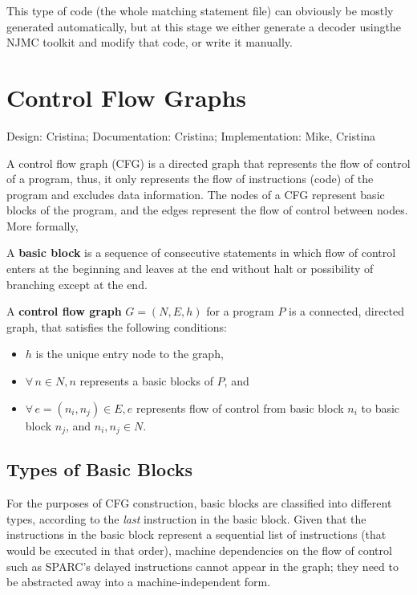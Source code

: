 This type of code (the whole matching statement file) can
obviously be mostly generated automatically, but at this stage we
either generate a decoder usingthe NJMC toolkit and modify that
code, or write it manually.


\section{Control Flow Graphs}
\label{sec-cfg}

{\small
\begin{flushright}
Design: Cristina; Documentation: Cristina; Implementation: Mike, Cristina
\end{flushright} 
}

A control flow graph (CFG) is a directed graph that represents the flow of 
control of a program, thus, it only represents the flow of instructions 
(code) of the program and excludes data information.
The nodes of a CFG represent basic blocks of the program, and the edges 
represent the flow of control between nodes.  More formally,

\begin{definition} \cite{Aho86}
\label{def-bb}
A {\bf basic block} is a sequence of consecutive statements in which
flow of control enters at the beginning and leaves at the end without
halt or possibility of branching except at the end.   
\end{definition}


\begin{definition}
\label{def-cfg}
A {\bf control flow graph} $G = (N,E,h)$ for a program $P$ is a connected,
directed graph, that satisfies the following conditions:
\begin{itemize}
\item $h$ is the unique entry node to the graph, 
\item $\forall \, n \in N, n$ represents a basic blocks of $P$, and 
\item $\forall \, e = (n_{i},n_{j}) \in E, e$ represents flow of control from
basic block $n_{i}$ to basic block $n_{j}$, and $n_{i}, n_{j} \in N$.
\end{itemize}
\end{definition}


\subsection{Types of Basic Blocks}
For the purposes of CFG construction, basic blocks are
classified into different types, according to the {\em last} instruction in 
the basic block.  Given that the instructions in the basic block
represent a sequential list of instructions (that would be executed
in that order), machine dependencies on the flow of control such as 
SPARC's delayed instructions cannot appear in the graph; they need
to be abstracted away into a machine-independent form.

